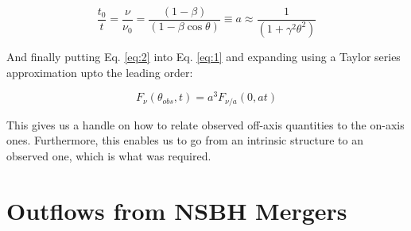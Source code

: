     \begin{equation}
        \label{eq:2}
        \dfrac{t_0}{t} =
            \dfrac{\nu}{\nu_0}
                       =
            \dfrac{(1 - \beta)}{(1 - \beta \cos \theta)}
            \equiv a
            \approx \dfrac{1}{(1 + \gamma^2 \theta^2)}
    \end{equation}

    And finally putting Eq. \ref{eq:2} into Eq. \ref{eq:1} and expanding using a Taylor
    series approximation upto the leading order:

    \begin{equation}
        \label{eq:3}
        F_{\nu}(\theta_{obs}, t) = a^3 F_{\nu/a}(0, at)
    \end{equation}

    This gives us a handle on how to relate observed off-axis quantities to the on-axis
    ones. Furthermore, this enables us to go from an intrinsic structure to an observed
    one, which is what was required.

\section{Outflows from NSBH Mergers}\label{sec:nsbh}

